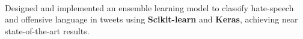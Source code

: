 \documentclass[]{dafirebanks-resume-openfont}
\begin{document}
\begin{minipage}[t]{0.66\textwidth}
\\
\hspace{90pt} 
\begin{tightemize}
	\item Designed and implemented an ensemble learning model to classify hate-speech and offensive language in tweets using \textbf{Scikit-learn} and \textbf{Keras}, achieving near state-of-the-art results.
\end{tightemize}
\sectionsep


\end{minipage} 
\end{document}
